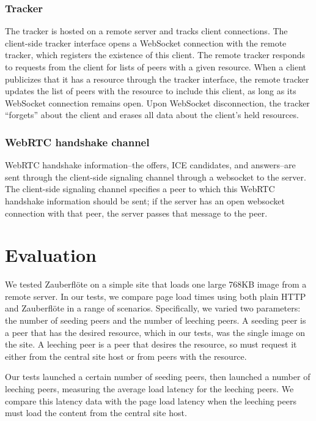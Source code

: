\documentclass[letterpaper,twocolumn,10pt]{article}
\newcommand{\zbf}{Zauberfl\"{o}te\xspace}
\begin{document}
\subsubsection{Tracker}
The tracker is hosted on a remote server and tracks client connections.
The client-side tracker interface opens a WebSocket connection with the remote tracker,
which registers the existence of this client. The remote tracker responds to
requests from the client for lists of peers with a given resource. When a client
publicizes that it has a resource through the tracker interface, the remote tracker updates
the list of peers with the resource to include this client, as
long as its WebSocket connection remains open. Upon WebSocket disconnection,
the tracker ``forgets'' about the client and erases all data about the client's
held resources.

\subsubsection{WebRTC handshake channel}

WebRTC handshake information--the offers, ICE candidates, and answers--are
sent through the client-side signaling channel through a websocket to
the server. The client-side signaling channel specifies a peer to which
this WebRTC handshake information should be sent; if the server has an open
websocket connection with that peer, the server passes that message to the peer.

\section{Evaluation}

We tested \zbf on a simple site that loads one large 768KB image from a remote server.
In our tests, we compare page load times using both plain HTTP and \zbf in a range of
scenarios. Specifically, we varied two parameters: the number of seeding peers and the
number of leeching peers. A seeding peer is a peer that has the desired resource, which
in our tests, was the single image on the site. A leeching peer is a peer that desires the
resource, so must request it either from the central site host or from peers with the resource.

Our tests launched a certain number of seeding peers, then launched a number of
leeching peers, measuring the average load latency for the leeching peers. We compare
this latency data with the page load latency when the leeching peers must load the content from the
central site host.
\end{document}
